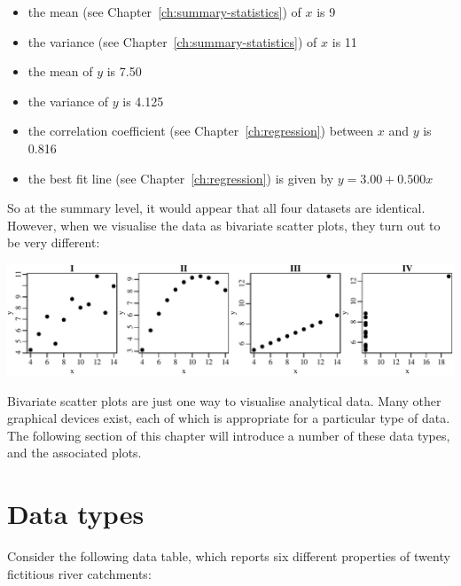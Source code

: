 \begin{itemize}\label{pg:anscombe}
\item the mean (see Chapter~\ref{ch:summary-statistics}) of $x$ is 9
\item the variance (see Chapter~\ref{ch:summary-statistics}) of $x$ is 11
\item the mean of $y$ is 7.50
\item the variance of $y$ is 4.125
\item the correlation coefficient (see Chapter~\ref{ch:regression})
  between $x$ and $y$ is 0.816
\item the best fit line (see Chapter~\ref{ch:regression}) is given by $y =
  3.00 + 0.500 x$
\end{itemize}

So at the summary level, it would appear that all four datasets are
identical. However, when we visualise the data as bivariate scatter
plots, they turn out to be very different:\medskip

\noindent\includegraphics[width=\textwidth]{../figures/anscombe.pdf}
\begingroup
{}\label{fig:anscombe}
\endgroup

Bivariate scatter plots are just one way to visualise analytical data.
Many other graphical devices exist, each of which is appropriate for a
particular type of data. The following section of this chapter will
introduce a number of these data types, and the associated plots.

\section{Data types}
\label{sec:datatypes}

Consider the following data table, which reports six different
properties of twenty fictitious river catchments:

